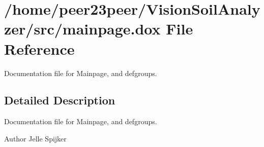 \hypertarget{mainpage_8dox}{}\section{/home/peer23peer/\+Vision\+Soil\+Analyzer/src/mainpage.dox File Reference}
\label{mainpage_8dox}


Documentation file for Mainpage, and defgroups.  




\subsection{Detailed Description}
Documentation file for Mainpage, and defgroups. 

\begin{DoxyAuthor}{Author}
Jelle Spijker 
\end{DoxyAuthor}
